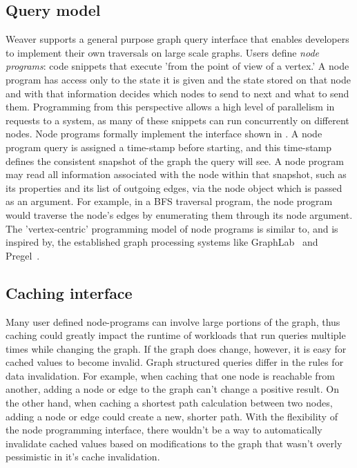 \documentclass[letterpaper,twocolumn,11pt,tight]{article}
\begin{document}
\subsection{Query model}
Weaver supports a general purpose graph query interface that enables developers to implement their own traversals on large scale graphs.
Users define \emph{node programs}: code snippets that execute 'from the point of view of a vertex.' A node program has access only to the state it is given and the state stored on that node and with that information decides which nodes to send to next and what to send them. Programming from this perspective allows a high level of parallelism in requests to a system, as many of these snippets can run concurrently on different nodes. Node programs formally implement the interface shown in .
A node program query is assigned a time-stamp before starting, and this time-stamp defines the consistent snapshot of the graph the query will see.
A node program may read all information associated with the node within that snapshot, such as its properties
and its list of outgoing edges, via the node object which is passed
as an argument. For example, in a BFS traversal program, the node program would traverse the
node's edges by enumerating them through its node argument.
The 'vertex-centric' programming model of node programs is similar to, and is inspired
by, the established graph processing systems like GraphLab~\cite{powergraph} and
Pregel~\cite{pregel}. 

\subsection{Caching interface}
Many user defined node-programs can involve large portions of the graph, thus caching could greatly impact the runtime of workloads that run queries multiple times while changing the graph. If the graph does change, however, it is easy for cached values to become invalid. Graph structured queries differ in the rules for data invalidation. For example, when caching that one node is reachable from another, adding a node or edge to the graph can't change a positive result. On the other hand, when caching a shortest path calculation between two nodes, adding a node or edge could create a new, shorter path. With the flexibility of the node programming interface, there wouldn't be a way to automatically invalidate cached values based on modifications to the graph that wasn't overly pessimistic in it's cache invalidation.
\end{document}
